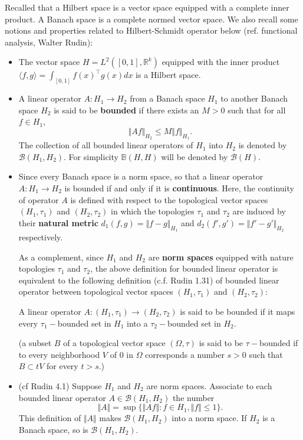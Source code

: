 \begin{remark}
	Recalled that a Hilbert space is a vector space equipped with a complete inner product. A Banach space is a complete normed vector space. We also recall some notions and properties related to Hilbert-Schmidt operator below (ref. functional analysis, Walter Rudin):
	\begin{itemize}
		\item 
		The vector space $H = L^2([0,1], \mathbb{R}^k)$ equipped with the inner product $\langle f,g \rangle = \int_{[0,1]} f(x)^\top g(x)dx$ is a Hilbert space. 
		\item A linear operator $A: H_1 \to H_2$ from a Banach space $H_1$ to another Banach space $H_2$ is said to be \textbf{bounded} if there exists an $M > 0$ such that for all $f \in H_1$,
		$$
			\Vert Af \Vert_{H_2} \leq M \Vert f \Vert_{H_1}.
		$$
		The collection of all bounded linear operators of $H_1$ into $H_2$ is denoted by $\mathcal{B}(H_1, H_2)$. For simplicity $\mathbb{B}(H,H)$ will be denoted by $\mathcal{B}(H)$.
		
		\item Since every Banach space is a norm space, so that a linear operator $A: H_1 \to H_2$ is bounded if and only if it is \textbf{continuous}. 				
		Here, the continuity of operator $A$ is defined with respect to the topological vector spaces $(H_1, \tau_1)$ and $(H_2, \tau_2)$ in which the topologies $\tau_1$ and $\tau_2$ are induced by their \textbf{natural metric} $d_1(f,g) = \Vert f-g \Vert_{H_1}$ and $d_2(f',g')= \Vert f'-g'\Vert_{H_2}$ respectively.
		
		
		As a complement, since $H_1$ and $H_2$ are \textbf{norm spaces} equipped with nature topologies $\tau_1$ and $\tau_2$, the above definition for bounded linear operator is equivalent to the following definition (c.f. Rudin 1.31) of bounded linear operator between topological vector spaces $(H_1, \tau_1)$ and $(H_2, \tau_2)$:
		
		A linear operator $A: (H_1, \tau_1) \to (H_2, \tau_2)$ is said to be bounded if it maps every $\tau_1-$bounded set in $H_1$ into a $\tau_2-$bounded set in $H_2$.
		
		(a subset $B$ of a topological vector space $(\Omega,\tau)$ is said to be $\tau-$bounded if to every neighborhood $V$ of $0$ in $\Omega$ corresponds a number $s>0$ such that $B \subset t V$ for every $t>s$.)
		
		\item (cf Rudin 4.1) Suppose $H_1$ and $H_2$ are norm spaces. Associate to each bounded linear operator $A \in \mathcal{B}(H_1, H_2)$ the number 
		$$
			\Vert A \Vert = \sup\{ \Vert A f \Vert: f \in H_1, \Vert f \Vert \leq 1 \}.
		$$
		This definition of $\Vert A \Vert$ makes $\mathcal{B}(H_1, H_2)$ into a norm space. If $H_2$ is a Banach space, so is $\mathcal{B}(H_1, H_2)$.
		

\end{itemize}
\end{remark}
